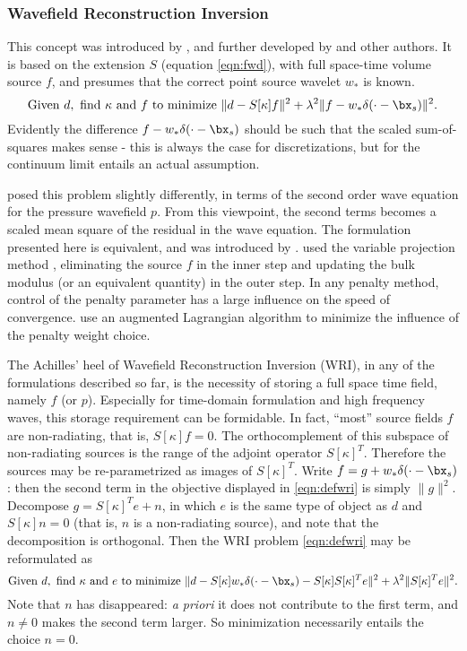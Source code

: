 \subsubsection{Wavefield Reconstruction Inversion}
This concept was introduced by \cite{LeeuwenHerrmannWRI:13}, and further
developed by \cite{LeeuwenHerrmann:16,WangYingst:SEG16} and other
authors. It is based on the extension $S$ (equation \ref{eqn:fwd}), with full
space-time volume source $f$, and presumes that the correct point
source wavelet $w_*$ is known. 
\begin{equation}
  \label{eqn:defwri}
  \mbox{Given } d, \mbox{ find }\kappa \mbox{ and }f \mbox{ to
    minimize }
  \| d -  S[\kappa]f\|^2+\lambda^2\|f-w_*\delta(\cdot-\bx_s)\|^2.
\end{equation}
Evidently the difference $f-w_*\delta(\cdot-\bx_s)$ should be such
that the scaled sum-of-squares makes sense - this is always the case
for discretizations, but for the continuum limit entails an actual
assumption.

\cite{LeeuwenHerrmannWRI:13} posed this problem slightly
differently, in terms of the second order wave equation for the
pressure wavefield $p$. From this viewpoint, the 
second terms becomes a scaled mean square of the residual in the
wave equation. The formulation presented here is equivalent, and was
introduced by \cite{WangYingst:SEG16}. \cite{LeeuwenHerrmann:16} used
the variable projection method \cite[]{GolubPereyra:03}, eliminating the source $f$ in the
inner step and updating the bulk modulus (or an equivalent quantity)
in the outer step. In any penalty method, control of the penalty
parameter has a large influence on the speed of
convergence. \cite{Aghamiry:19} use an augmented Lagrangian algorithm
to minimize the influence of the penalty weight choice.

The Achilles' heel of Wavefield Reconstruction Inversion (WRI), in any of
the formulations described so far, is the necessity of storing a full
space time field, namely $f$ (or $p$). Especially for time-domain
formulation and high frequency waves, this storage requirement can be
formidable. In fact, ``most'' source fields $f$ are non-radiating,
that is, $S[\kappa]f=0$. The orthocomplement of this subspace of
non-radiating sources is the range of the adjoint operator
$S[\kappa]^T$. Therefore the sources may be re-parametrized as images of
$S[\kappa]^T$. Write $f = g + w_*\delta(\cdot-\bx_s)$: then the second term in
the objective displayed in \ref{eqn:defwri} is simply $\|g\|^2$.
Decompose $g = S[\kappa]^Te + n$, in
which $e$ is the same type of object as $d$ and $S[\kappa]n=0$ (that
is, $n$ is a non-radiating
source), and note that the decomposition is orthogonal. Then the WRI problem \ref{eqn:defwri} may be reformulated as
\begin{equation}
  \label{eqn:defwrireform}
  \mbox{Given } d, \mbox{ find }\kappa \mbox{ and }e \mbox{ to
    minimize }
  \| d -  S[\kappa]w_*\delta(\cdot-\bx_s) - S[\kappa]S[\kappa]^Te\|^2+\lambda^2\|S[\kappa]^Te\|^2.
\end{equation}
Note that $n$ has disappeared: {\em a priori} it does not contribute to the first
term, and $n \ne 0$ makes the second term larger. So minimization
necessarily entails the choice $n=0$.

